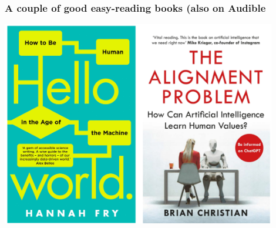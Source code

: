 \begin{frame}
\frametitle{A couple of good easy-reading books (also on Audible}

\begin{center}
    \includegraphics[width=0.9\textwidth]{./misc_images/books}
\end{center}


\end{frame}